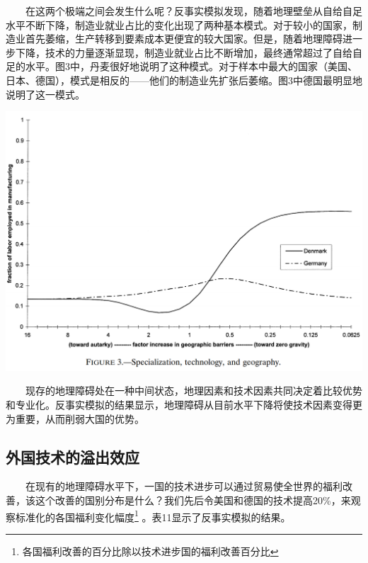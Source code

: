 \documentclass[
]{article}
\begin{document}
　　在这两个极端之间会发生什么呢？反事实模拟发现，随着地理壁垒从自给自足水平不断下降，制造业就业占比的变化出现了两种基本模式。对于较小的国家，制造业首先萎缩，生产转移到要素成本更便宜的较大国家。但是，随着地理障碍进一步下降，技术的力量逐渐显现，制造业就业占比不断增加，最终通常超过了自给自足的水平。图3中，丹麦很好地说明了这种模式。对于样本中最大的国家（美国、日本、德国），模式是相反的------他们的制造业先扩张后萎缩。图3中德国最明显地说明了这一模式。

\begin{center}\includegraphics[width=1\linewidth]{Figures/Figure3} \end{center}

　　现存的地理障碍处在一种中间状态，地理因素和技术因素共同决定着比较优势和专业化。反事实模拟的结果显示，地理障碍从目前水平下降将使技术因素变得更为重要，从而削弱大国的优势。

\hypertarget{ux5916ux56fdux6280ux672fux7684ux6ea2ux51faux6548ux5e94}{%
\subsection{外国技术的溢出效应}\label{ux5916ux56fdux6280ux672fux7684ux6ea2ux51faux6548ux5e94}}

　　在现有的地理障碍水平下，一国的技术进步可以通过贸易使全世界的福利改善，该这个改善的国别分布是什么？我们先后令美国和德国的技术提高20\%，来观察标准化的各国福利变化幅度\footnote{各国福利改善的百分比除以技术进步国的福利改善百分比} 。表11显示了反事实模拟的结果。
\end{document}

